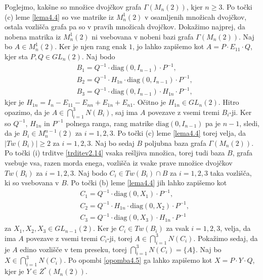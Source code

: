 \documentclass[mat1, tisk]{fmfdelo}
\begin{document}
\begin{dokaz}
  Poglejmo, kakšne so množice dvojčkov grafa $\Gamma(M_n(2))$, kjer $n \geq 3$. 
  Po točki (c) leme \ref{lema4.4} so vse matrike iz ${M}_n^1(2)$ v osamljenih množicah 
  dvojčkov, ostala vozlišča grafa pa so v pravih množicah dvojčkov. Dokažimo najprej, 
  da nobena matrika iz ${M}_n^1(2)$ ni vsebovana v nobeni bazi grafa $\Gamma(M_n(2))$. Naj bo 
  $A \in {M}_n^1(2)$. Ker je njen rang enak $1$, jo lahko zapišemo kot $A = P \cdot E_{11} \cdot Q$, 
  kjer sta $P, Q \in GL_n(2)$. Naj bodo
  \begin{align*}
    &B_1 = Q^{-1} \cdot \text{diag}(0, I_{n-1}) \cdot P^{-1}, \\
    &B_2 = Q^{-1} \cdot H_{1n} \cdot \text{diag}(0, I_{n-1}) \cdot P^{-1},\\
    &B_3 = Q^{-1} \cdot \text{diag}(0, I_{n-1}) \cdot H_{1n} \cdot P^{-1},
  \end{align*} 
  kjer je 
  $H_{1n} = I_n - E_{11} - E_{nn} + E_{1n} + E_{n1}$. Očitno je $H_{1n} \in GL_n(2)$. 
  Hitro opazimo, da je $A \in \bigcap\limits_{i=1}^{3} N(B_i)$, saj ima $A$ povezave z 
  vsemi tremi $B_i$-ji. Ker so $Q^{-1}$, $H_{1n}$ in $P^{-1}$ polnega ranga, rang matrike 
  $\text{diag}(0, I_{n-1})$ pa je $n-1$, sledi, da je $B_i \in {M}_n^{n-1}(2)$ za $i = 1, 2, 3$. Po 
  točki (c) leme \ref{lema4.4} torej velja, da $|Tw(B_i)| \geq 2$ za $i = 1, 2, 3$. Naj bo 
  sedaj $B$ poljubna baza grafa $\Gamma(M_n(2))$. Po točki (i) trditve \ref{trditev2.14} 
  vsaka rešljiva množica, torej tudi baza $B$, grafa vsebuje vsa, razen morda enega, vozlišča iz 
  vsake prave množice dvojčkov $Tw(B_i)$ za $i = 1, 2, 3$. Naj bodo $C_i \in Tw(B_i) \cap B$ za 
  $i = 1, 2, 3$ taka vozlišča, ki so vsebovana v $B$. Po točki (b) leme \ref{lema4.4} jih lahko zapišemo kot 
  \begin{align*}
    &C_1 = Q^{-1} \cdot \text{diag}(0, X_1) \cdot P^{-1}, \\
    &C_2 = Q^{-1} \cdot H_{1n} \cdot \text{diag}(0, X_2) \cdot P^{-1},\\
    &C_3 = Q^{-1} \cdot \text{diag}(0, X_3) \cdot H_{1n} \cdot P^{-1} 
  \end{align*}
  za $X_1, X_2, X_3 \in GL_{n-1}(2)$. 
  Ker je $C_i \in Tw(B_i)$ za vsak $i = 1, 2, 3$, velja, da ima $A$ povezave z vsemi tremi $C_i$-ji, 
  torej $A \in \bigcap\limits_{i=1}^{3} N(C_i)$. Pokažimo sedaj, da je $A$ edino vozlišče v tem 
  preseku, torej $\bigcap\limits_{i=1}^{3} N(C_i) = \{A\}$. Naj bo $X \in \bigcap\limits_{i=1}^{3} N(C_i)$. 
  Po opombi \ref{opomba4.5} ga lahko zapišemo kot $X = P \cdot Y \cdot Q$, kjer je $Y \in Z^*(M_n(2))$. 

\end{dokaz}
\end{document}
